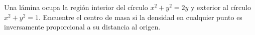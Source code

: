 \item Una lámina ocupa la región interior del círculo $x^2 + y^2 = 2y$ y exterior al círculo $x^2 + y^2 = 1$. Encuentre el centro de masa si la densidad en cualquier punto es inversamente proporcional a su distancia al origen.
